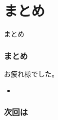 \documentclass[12pt,dvipdfmx]{beamer}
\newcommand{\backupbegin}{
   \newcounter{framenumberappendix}
   \setcounter{framenumberappendix}{\value{framenumber}}
}
\begin{document}
\section{まとめ}
\begin{frame}
 \centering
 {\Large まとめ}
\end{frame}

\begin{frame}
\frametitle{まとめ}
お疲れ様でした。

\begin{itemize}
\item 
\end{itemize}
\end{frame}


\begin{frame}
\frametitle{次回は}
\end{frame}












\end{document}
